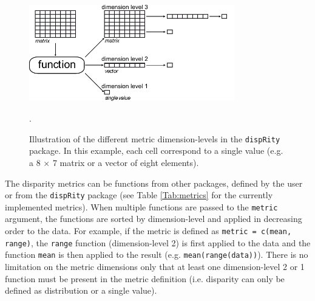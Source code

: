\documentclass[12pt,letterpaper]{article}
\newcommand{\disp}{\texttt{dispRity} }
\begin{document}
\begin{figure}[!htbp]
\centering
   \includegraphics[width=0.8\textwidth]{../inst/gitbook/dispRity_fun.pdf} 
\caption{Illustration of the different metric dimension-levels in the \disp package. In this example, each cell correspond to a single value (e.g. a 8 $\times$ 7 matrix or a vector of eight elements).}.
\label{Fig:levels}
\end{figure}

The disparity metrics can be functions from other packages, defined by the user or from the \disp package (see Table \ref{Tab:metrics} for the currently implemented metrics).
When multiple functions are passed to the \texttt{metric} argument, the functions are sorted by dimension-level and applied in decreasing order to the data.
For example, if the metric is defined as \texttt{metric = c(mean, range)}, the \texttt{range} function (dimension-level 2) is first applied to the data and the function \texttt{mean} is then applied to the result (e.g. \texttt{mean(range(data))}).
There is no limitation on the metric dimensions only that at least one dimension-level 2 or 1 function must be present in the metric definition (i.e. disparity can only be defined as distribution or a single value).
\end{document}
